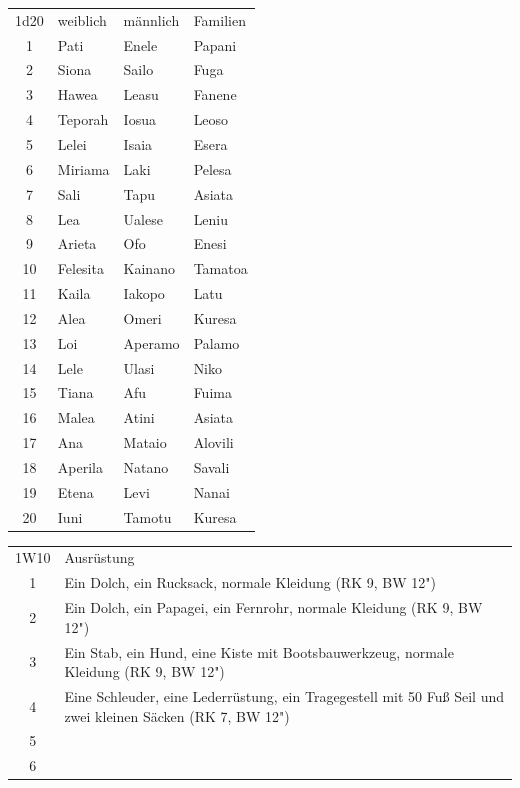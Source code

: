 \documentclass[11pt]{wbzine}
\begin{document}
\begin{multicols}{2}
\begin{tabularx}{\columnwidth}{clll}
    1d20 &  weiblich    &    männlich    &    Familien \\
    1   &    Pati       &     Enele      &     Papani \\
    2    &   Siona      &     Sailo      &     Fuga\\
    3   &    Hawea      &     Leasu      &     Fanene\\
    4    &   Teporah    &     Iosua      &     Leoso\\
    5     &  Lelei      &     Isaia      &     Esera\\
    6     &  Miriama   &      Laki       &     Pelesa\\
    7     &  Sali      &      Tapu       &     Asiata\\
    8     &  Lea       &      Ualese     &     Leniu\\
    9      & Arieta    &      Ofo        &     Enesi\\
    10     & Felesita  &      Kainano    &     Tamatoa\\
    11     & Kaila     &      Iakopo     &     Latu\\
    12    &  Alea      &      Omeri      &     Kuresa\\
    13    &  Loi       &      Aperamo    &     Palamo\\
    14    &  Lele      &      Ulasi      &     Niko\\
    15     & Tiana     &      Afu        &     Fuima\\
    16     & Malea     &      Atini      &     Asiata\\
    17     & Ana       &      Mataio     &     Alovili\\
    18     & Aperila   &      Natano     &     Savali\\
    19     & Etena     &      Levi       &     Nanai\\
    20     & Iuni      &      Tamotu     &     Kuresa\\
\end{tabularx}

\begin{tabularx}{\columnwidth}{cZ}
    1W10 & Ausrüstung \\
    1 &
    Ein Dolch, ein Rucksack, normale Kleidung (RK 9, BW 12") \\
    2 &
    Ein Dolch, ein Papagei, ein Fernrohr, normale Kleidung (RK 9, BW
    12")\\
    3 & 
    Ein Stab, ein Hund, eine Kiste mit Bootsbauwerkzeug, normale
    Kleidung (RK 9, BW 12") \\
    4 & 
    Eine Schleuder, eine Lederrüstung, ein Tragegestell mit 50 Fuß
    Seil und zwei kleinen Säcken (RK 7, BW 12") \\
    5 &
    \\
6 &
\\


\end{tabularx}
\end{multicols}
\end{document}
